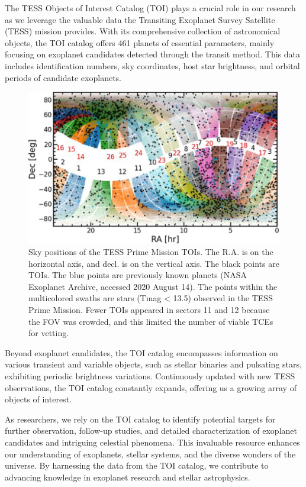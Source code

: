 \documentclass{article}
\begin{document}
The TESS Objects of Interest Catalog (TOI) plays a crucial role in our research as we leverage the valuable data the Transiting Exoplanet Survey Satellite (TESS) mission provides. With its comprehensive collection of astronomical objects, the TOI catalog offers 461 planets of essential parameters, mainly focusing on exoplanet candidates detected through the transit method. This data includes identification numbers, sky coordinates, host star brightness, and orbital periods of candidate exoplanets.

\begin{figure}[H]
    \centering
    \includegraphics[width=1\linewidth]{image/catalog_dis.png}
    \captionsetup{font=small} 
    \caption{Sky positions of the TESS Prime Mission TOIs. The R.A. is on the horizontal axis, and decl. is on the vertical axis. The black points are TOIs. The blue points are previously known planets (NASA Exoplanet Archive, accessed 2020 August 14). The points within the multicolored swaths are stars (Tmag < 13.5) observed in the TESS Prime Mission. Fewer TOIs appeared in sectors 11 and 12 because the FOV was crowded, and this limited the number of viable TCEs for vetting.}
    \label{fig:dis_cata}
\end{figure}

Beyond exoplanet candidates, the TOI catalog encompasses information on various transient and variable objects, such as stellar binaries and pulsating stars, exhibiting periodic brightness variations. Continuously updated with new TESS observations, the TOI catalog constantly expands, offering us a growing array of objects of interest.

As researchers, we rely on the TOI catalog to identify potential targets for further observation, follow-up studies, and detailed characterization of exoplanet candidates and intriguing celestial phenomena. This invaluable resource enhances our understanding of exoplanets, stellar systems, and the diverse wonders of the universe. By harnessing the data from the TOI catalog, we contribute to advancing knowledge in exoplanet research and stellar astrophysics.
\end{document}
